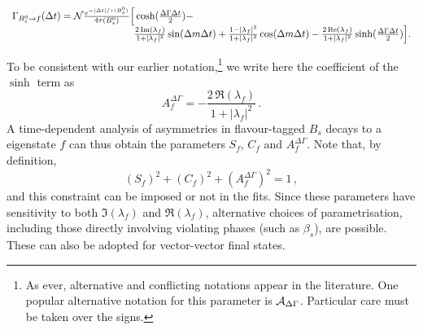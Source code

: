 \begin{equation}
  \label{eq:cp_uta:td_cp_bs_asp2}
  \begin{array}{lcr}
    \mc{2}{l}{
      \Gamma_{\Bs \to f} (\Delta t) =
      {\cal N} %
      \frac{e^{-| \Delta t | / \tau(\Bs)}}{4\tau(\Bs)}
      \Big[ 
      \cosh(\frac{\Delta \Gamma \Delta t}{2}) -
    } & \hspace{40mm} \\
    \hspace{40mm} & 
    \mc{2}{r}{
      \frac{2\, \Im(\lambda_f)}{1 + |\lambda_f|^2} \sin(\Delta m \Delta t) +
      \frac{1 - |\lambda_f|^2}{1 + |\lambda_f|^2} \cos(\Delta m \Delta t) -
      \frac{2\, \Re(\lambda_f)}{1 + |\lambda_f|^2} \sinh(\frac{\Delta \Gamma \Delta t}{2})
      \Big]. 
    } \\
  \end{array}
\end{equation}

To be consistent with our earlier notation,\footnote{
  As ever, alternative and conflicting notations appear in the literature.
  One popular alternative notation for this parameter is 
  ${\cal A}_{\Delta \Gamma}$.
  Particular care must be taken over the signs.
}
we write here the coefficient of the $\sinh$ term as
\begin{equation}
  A^{\Delta \Gamma}_f = - \frac{2\, \Re(\lambda_f)}{1 + |\lambda_f|^2} \, .
\end{equation}
A time-dependent analysis of \CP asymmetries in flavour-tagged
$B_s$ decays to a \CP eigenstate $f$ can thus obtain the parameters 
$S_f$, $C_f$ and $A^{\Delta \Gamma}_f$.
Note that, by definition, 
\begin{equation}
  \left( S_f \right)^2 + \left( C_f \right)^2 + \left( A^{\Delta \Gamma}_f \right)^2 = 1 \, ,
\end{equation}
and this constraint can be imposed or not in the fits.
Since these parameters have sensitivity to both
$\Im(\lambda_f)$ and $\Re(\lambda_f)$,
alternative choices of parametrisation, 
including those directly involving \CP violating phases (such as $\beta_s$), 
are possible.
These can also be adopted for vector-vector final states.

